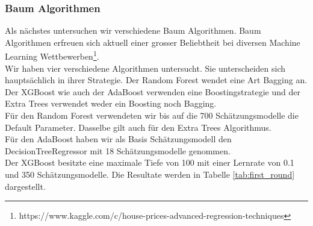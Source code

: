 \subsubsection{Baum Algorithmen}
Als nächstes untersuchen wir verschiedene Baum Algorithmen. Baum Algorithmen erfreuen sich aktuell einer grosser Beliebtheit bei diversen Machine Learning Wettbewerben\footnote{https://www.kaggle.com/c/house-prices-advanced-regression-techniques}.\\[2ex]
%
Wir haben vier verschiedene Algorithmen untersucht. Sie unterscheiden sich hauptsächlich in ihrer Strategie. Der Random Forest wendet eine Art Bagging an. Der XGBoost wie auch der AdaBoost verwenden eine Boostingstrategie und der Extra Trees verwendet weder ein Boosting noch Bagging.\\
Für den Random Forest verwendeten wir bis auf die 700 Schätzungsmodelle die Default Parameter. Dasselbe gilt auch für den Extra Trees Algorithmus.\\
Für den AdaBoost haben wir als Basis Schätzungsmodell den DecisionTreeRegressor mit 18 Schätzungsmodelle genommen.\\
Der XGBoost besitzte eine maximale Tiefe von 100 mit einer Lernrate von 0.1 und 350 Schätzungsmodelle.
Die Resultate werden in Tabelle \ref{tab:first_round} dargestellt.

\begin{table}[ht]
\centering
{}
\caption{Ergebnisse der Baum Algorithmen}
\label{tab:first_round}
\end{table}

